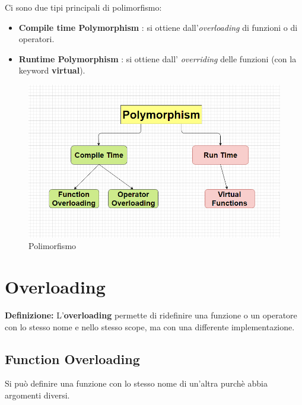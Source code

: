 \textsf{\small Ci sono due tipi principali di polimorfismo: }

\begin{itemize}
	\item \textsf{\small \textbf{Compile time Polymorphism} : si ottiene dall'\emph{overloading} di funzioni o di operatori.}
	\item \textsf{\small \textbf{Runtime Polymorphism} : si ottiene dall' \emph{overriding} delle funzioni (con la keyword \textbf{virtual}).}
\end{itemize}

\begin{figure}[H]
	\centering
	\includegraphics[width=1\textwidth, height=1\textheight, keepaspectratio]{./imgs/polymorphism.png}
	\caption{Polimorfismo}
	\label{fig:polymorphism}
\end{figure}


\section{Overloading}

\textsf{\small \textbf{Definizione:} L'\textbf{overloading} permette di ridefinire una funzione o un operatore con lo stesso nome e nello stesso scope, ma con una differente implementazione.} \\

\subsection{Function Overloading}

\textsf{\small Si può definire una funzione con lo stesso nome di un'altra purchè abbia argomenti diversi.} \\

